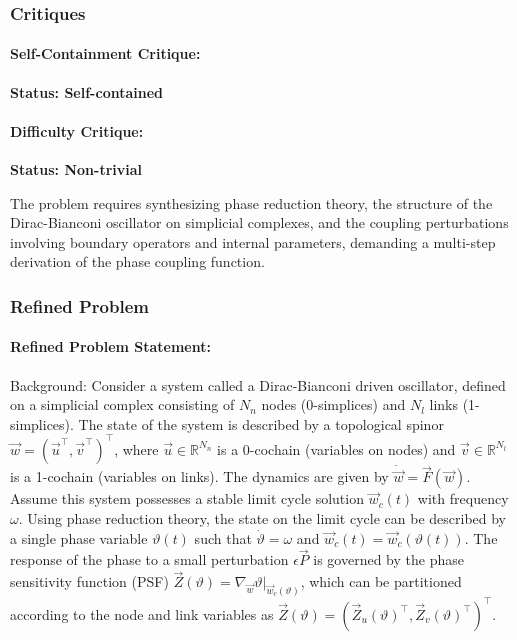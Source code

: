 \documentclass[10pt]{article}
\begin{document}
\subsubsection*{Critiques}
\paragraph*{Self-Containment Critique:}
\textcolor{pass}{\textbf{Status: Self-contained}}




\paragraph*{Difficulty Critique:}
\textcolor{pass}{\textbf{Status: Non-trivial}}

The problem requires synthesizing phase reduction theory, the structure of the Dirac-Bianconi oscillator on simplicial complexes, and the coupling perturbations involving boundary operators and internal parameters, demanding a multi-step derivation of the phase coupling function.


\subsubsection*{Refined Problem}
\paragraph*{Refined Problem Statement:}
Background:
Consider a system called a Dirac-Bianconi driven oscillator, defined on a simplicial complex consisting of $N_n$ nodes (0-simplices) and $N_l$ links (1-simplices). The state of the system is described by a topological spinor $\vec{w} = (\vec{u}^\top, \vec{v}^\top)^\top$, where $\vec{u} \in \mathbb{R}^{N_n}$ is a 0-cochain (variables on nodes) and $\vec{v} \in \mathbb{R}^{N_l}$ is a 1-cochain (variables on links). The dynamics are given by $\dot{\vec{w}} = \vec{F}(\vec{w})$. Assume this system possesses a stable limit cycle solution $\vec{w}_c(t)$ with frequency $\omega$. Using phase reduction theory, the state on the limit cycle can be described by a single phase variable $\vartheta(t)$ such that $\dot{\vartheta} = \omega$ and $\vec{w}_c(t) = \vec{w}_c(\vartheta(t))$. The response of the phase to a small perturbation $\epsilon \vec{P}$ is governed by the phase sensitivity function (PSF) $\vec{Z}(\vartheta) = \nabla_{\vec{w}} \vartheta \big|_{\vec{w}_c(\vartheta)}$, which can be partitioned according to the node and link variables as $\vec{Z}(\vartheta) = (\vec{Z}_u(\vartheta)^\top, \vec{Z}_v(\vartheta)^\top)^\top$.
\end{document}
